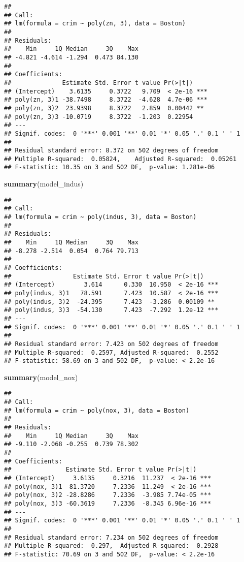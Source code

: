 \documentclass[
]{article}
\newenvironment{Shaded}{\begin{snugshade}}{\end{snugshade}}
\newcommand{\FunctionTok}[1]{\textcolor[rgb]{0.13,0.29,0.53}{\textbf{#1}}}
\newcommand{\NormalTok}[1]{#1}
\begin{document}
\begin{verbatim}
## 
## Call:
## lm(formula = crim ~ poly(zn, 3), data = Boston)
## 
## Residuals:
##    Min     1Q Median     3Q    Max 
## -4.821 -4.614 -1.294  0.473 84.130 
## 
## Coefficients:
##              Estimate Std. Error t value Pr(>|t|)    
## (Intercept)    3.6135     0.3722   9.709  < 2e-16 ***
## poly(zn, 3)1 -38.7498     8.3722  -4.628  4.7e-06 ***
## poly(zn, 3)2  23.9398     8.3722   2.859  0.00442 ** 
## poly(zn, 3)3 -10.0719     8.3722  -1.203  0.22954    
## ---
## Signif. codes:  0 '***' 0.001 '**' 0.01 '*' 0.05 '.' 0.1 ' ' 1
## 
## Residual standard error: 8.372 on 502 degrees of freedom
## Multiple R-squared:  0.05824,    Adjusted R-squared:  0.05261 
## F-statistic: 10.35 on 3 and 502 DF,  p-value: 1.281e-06
\end{verbatim}

\begin{Shaded}
\begin{Highlighting}[]
\FunctionTok{summary}\NormalTok{(model\_indus)}
\end{Highlighting}
\end{Shaded}

\begin{verbatim}
## 
## Call:
## lm(formula = crim ~ poly(indus, 3), data = Boston)
## 
## Residuals:
##    Min     1Q Median     3Q    Max 
## -8.278 -2.514  0.054  0.764 79.713 
## 
## Coefficients:
##                 Estimate Std. Error t value Pr(>|t|)    
## (Intercept)        3.614      0.330  10.950  < 2e-16 ***
## poly(indus, 3)1   78.591      7.423  10.587  < 2e-16 ***
## poly(indus, 3)2  -24.395      7.423  -3.286  0.00109 ** 
## poly(indus, 3)3  -54.130      7.423  -7.292  1.2e-12 ***
## ---
## Signif. codes:  0 '***' 0.001 '**' 0.01 '*' 0.05 '.' 0.1 ' ' 1
## 
## Residual standard error: 7.423 on 502 degrees of freedom
## Multiple R-squared:  0.2597, Adjusted R-squared:  0.2552 
## F-statistic: 58.69 on 3 and 502 DF,  p-value: < 2.2e-16
\end{verbatim}

\begin{Shaded}
\begin{Highlighting}[]
\FunctionTok{summary}\NormalTok{(model\_nox)}
\end{Highlighting}
\end{Shaded}

\begin{verbatim}
## 
## Call:
## lm(formula = crim ~ poly(nox, 3), data = Boston)
## 
## Residuals:
##    Min     1Q Median     3Q    Max 
## -9.110 -2.068 -0.255  0.739 78.302 
## 
## Coefficients:
##               Estimate Std. Error t value Pr(>|t|)    
## (Intercept)     3.6135     0.3216  11.237  < 2e-16 ***
## poly(nox, 3)1  81.3720     7.2336  11.249  < 2e-16 ***
## poly(nox, 3)2 -28.8286     7.2336  -3.985 7.74e-05 ***
## poly(nox, 3)3 -60.3619     7.2336  -8.345 6.96e-16 ***
## ---
## Signif. codes:  0 '***' 0.001 '**' 0.01 '*' 0.05 '.' 0.1 ' ' 1
## 
## Residual standard error: 7.234 on 502 degrees of freedom
## Multiple R-squared:  0.297,  Adjusted R-squared:  0.2928 
## F-statistic: 70.69 on 3 and 502 DF,  p-value: < 2.2e-16
\end{verbatim}
\end{document}
